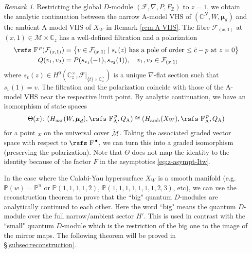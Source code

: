 \documentclass[11pt]{amsart}
\theoremstyle{definition} %
\theoremstyle{remark} %
\newtheorem{rem}[thm]{Remark}%
\newcommand{\CC}{\mathbb C}
\newcommand{\PP}{\mathbb P}
\newcommand{\ZZ}{\mathbb Z}
\newcommand{\nar}{\operatorname{nar}}
\newcommand{\marsfs}[1]{\mbox{\rsfs #1}}
\newcommand{\bmu}{\boldsymbol{\mu}}
\newcommand{\cM}{\mathcal{M}}
\newcommand{\cF}{\mathcal{F}}
\newcommand{\hc}{\hat{c}}
\newcommand{\amb}{\operatorname{amb}}
\newcommand{\rsF}{\marsfs{F}}
\newcommand{\uw}{\underline{w}}
\begin{document}
\begin{rem} 
\label{rem:gradedisom} 
Restricting the global $D$-module $(\cF,\nabla,P,F_\ZZ)$ 
to $z=1$, we obtain the analytic continuation between 
the narrow A-model VHS of $(\CC^N,W,\bmu_d)$ 
and the ambient A-model VHS of $X_W$ in 
Remark \ref{rem:A-VHS}. 
The fibre $\cF_{(x,1)}$ at $(x,1)\in \cM\times \CC_z$ has 
a well-defined filtration and a polarization 
\begin{align*} 
\rsF^{\, p} ( \cF_{(x,1)}) & = 
\left\{v\in \cF_{(x,1)} \;|\; s_v(z) 
\text{ has a pole of order $\le \hc-p$ at $z=0$} 
\right\} \\ 
Q(v_1,v_2) & = P(s_{v_1}(-1), s_{v_2}(1)), \quad 
v_1,v_2 \in \cF_{(x,1)}  
\end{align*} 
where $s_v(z) \in H^0(\CC^\times_z, \cF|_{\{t\}\times \CC_z^\times})$ 
is a unique $\nabla$-flat section such that $s_v(1)=v$. 
The filtration and the polarization coincide with those 
of the A-model VHS near the respective limit point. 
By analytic continuation, we have an isomorphism 
of state spaces 
\[
\Theta(x) \colon (H_{\nar}(W,\bmu_d), \rsF^{\, p}_{\rm A}, Q_{\rm A}) 
\cong (H_{\amb}(X_W), \rsF^{\, p}_{\rm A}, Q_{\rm A})  
\]
for a point $x$ on the universal cover $\widetilde{\cM}$. 
Taking the associated graded vector space 
with respect to $\rsF^{\,\bullet}$,  
we can turn this into a graded isomorphism 
(preserving the polarization). 
Note that $\Theta$ does not map the identity to the identity 
because of the factor $F$ in the asymptotics \eqref{eq:z-asympt-Itw}. 
\end{rem} 

In the case where the Calabi-Yau hypersurface 
$X_W$ is a smooth manifold (e.g.\ $\PP(\uw) = \PP^n$ or 
$\PP(1,1,1,1,2)$, $\PP(1,1,1,1,1,1,1,2,3)$, etc), 
we can use the reconstruction theorem to prove 
that the ``big" quantum $D$-modules are analytically 
continued to each other. 
Here the word ``big" means the 
quantum $D$-module over the full narrow/ambient sector $H'$. 
This is used in contrast with the ``small" quantum $D$-module 
which is the restriction of the big one to the 
image of the mirror maps. 
The following theorem will be proved in \S \ref{subsec:reconstruction}. 
\end{document}
